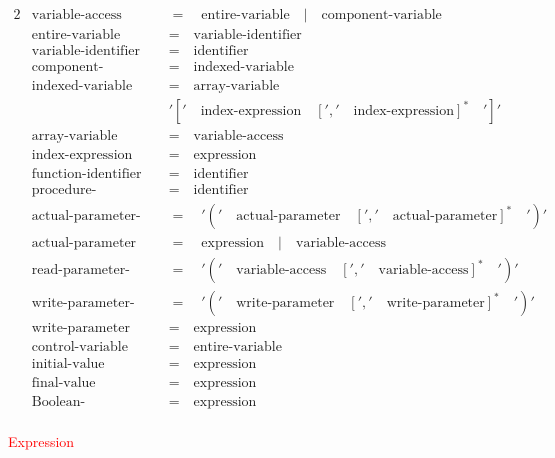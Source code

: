 \documentclass{article}
\begin{document}
\begin{alignat*}{2}
&\text{variable-access}\quad&&=\quad\text{entire-variable}\quad|\quad\text{component-variable}\\
&\text{entire-variable}\quad&&=\quad\text{variable-identifier}\\
&\text{variable-identifier}\quad&&=\quad\text{identifier}\\
&\text{component-variable}\quad&&=\quad\text{indexed-variable}\\
&\text{indexed-variable}\quad&&=\quad\text{array-variable}\\
&&&'['\quad\text{index-expression} \quad{[','\quad\text{index-expression}]}^*\quad']'\\
&\text{array-variable}\quad&&=\quad\text{variable-access}\\
&\text{index-expression}\quad&&=\quad\text{expression}\\
&\text{function-identifier}\quad&&=\quad\text{identifier}\\
&\text{procedure-identifier}\quad&&=\quad\text{identifier}\\
&\text{actual-parameter-list}\quad&&=\quad'('\quad\text{actual-parameter}\quad{[','\quad\text{actual-parameter}]}^*\quad')'\\
&\text{actual-parameter}\quad&&=\quad\text{expression}\quad|\quad\text{variable-access}\\
&\text{read-parameter-list}\quad&&=\quad'('\quad\text{variable-access}\quad{[','\quad\text{variable-access}]}^*\quad')'\\
&\text{write-parameter-list}\quad&&=\quad'('\quad\text{write-parameter}\quad{[','\quad\text{write-parameter}]}^*\quad')'\\
&\text{write-parameter}\quad&&=\quad\text{expression}\\
&\text{control-variable}\quad&&=\quad\text{entire-variable}\\
&\text{initial-value}\quad&&=\quad\text{expression}\\
&\text{final-value}\quad&&=\quad\text{expression}\\
&\text{Boolean-expression}\quad&&=\quad\text{expression}\\
\end{alignat*}

\textcolor{red}{Expression}
\end{document}
